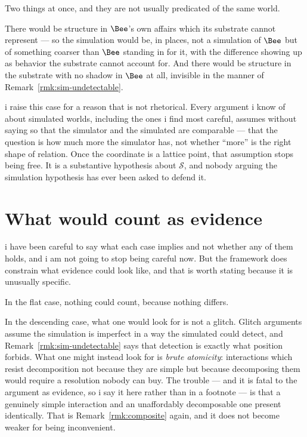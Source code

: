 \begin{remark}
\label{rmk:sim-skew-inside}
Two things at once, and they are not usually predicated of the same
world.

There would be structure in $\Bee$'s own affairs which its substrate
cannot represent --- so the simulation would be, in places, not a
simulation of $\Bee$ but of something coarser than $\Bee$ standing in for
it, with the difference showing up as behavior the substrate cannot
account for.
And there would be structure in the substrate with no shadow in $\Bee$ at
all, invisible in the manner of Remark~\ref{rmk:sim-undetectable}.

i raise this case for a reason that is not rhetorical.
Every argument i know of about simulated worlds, including the ones i
find most careful, assumes without saying so that the simulator and the
simulated are comparable --- that the question is how much more the
simulator has, not whether ``more'' is the right shape of relation.
Once the coordinate is a lattice point, that assumption stops being free.
It is a substantive hypothesis about $\mathcal{S}$, and nobody arguing
the simulation hypothesis has ever been asked to defend it.
\end{remark}

\section{What would count as evidence}
\label{sec:sim-evidence}

i have been careful to say what each case implies and not whether any of
them holds, and i am not going to stop being careful now.
But the framework does constrain what evidence could look like, and that
is worth stating because it is unusually specific.

In the flat case, nothing could count, because nothing differs.

In the descending case, what one would look for is not a glitch.
Glitch arguments assume the simulation is imperfect in a way the
simulated could detect, and Remark~\ref{rmk:sim-undetectable} says that
detection is exactly what position forbids.
What one might instead look for is \emph{brute atomicity}: interactions
which resist decomposition not because they are simple but because
decomposing them would require a resolution nobody can buy.
The trouble --- and it is fatal to the argument as evidence, so i say it
here rather than in a footnote --- is that a genuinely simple interaction
and an unaffordably decomposable one present identically.
That is Remark~\ref{rmk:composite} again, and it does not become weaker
for being inconvenient.

